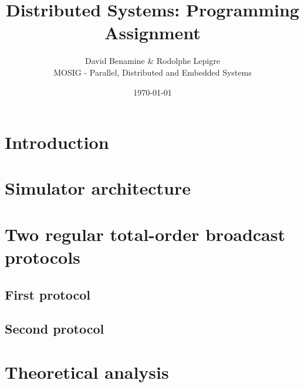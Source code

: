 \documentclass[a4paper]{article}
\begin{document}
\title{Distributed Systems: Programming Assignment}
\author{David Benamine \& Rodolphe Lepigre\\
        MOSIG - Parallel, Distributed and Embedded Systems}
\date{\today}
\maketitle

\section*{Introduction}

\section*{Simulator architecture}

\section*{Two regular total-order broadcast protocols}

\subsection*{First protocol}

\subsection*{Second protocol}

\section*{Theoretical analysis}
\end{document}
